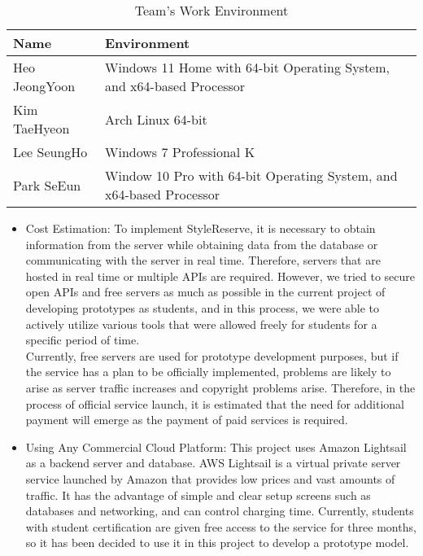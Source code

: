 \documentclass[conference]{IEEEtran}
\begin{document}
 \begin{table}[htdp]
 \caption{Team's Work Environment}
 \begin{tabular}{| p{3cm}|p{5.2cm} |}
 \hline
 Name & Environment \\ 
 \hline
 Heo JeongYoon & Windows 11 Home with 64-bit Operating System, and x64-based Processor \\
 \hline
 Kim TaeHyeon & Arch Linux 64-bit \\ 
 \hline
 Lee SeungHo & Windows 7 Professional K \\ 
 \hline
 Park SeEun & Window 10 Pro with 64-bit Operating System, and x64-based Processor \\ 
 \hline
 \end{tabular}
 \end{table}

\begin{itemize}
    \item Cost Estimation: To implement StyleReserve, it is necessary to obtain information from the server while obtaining data from the database or communicating with the server in real time. Therefore, servers that are hosted in real time or multiple APIs are required. However, we tried to secure open APIs and free servers as much as possible in the current project of developing prototypes as students, and in this process, we were able to actively utilize various tools that were allowed freely for students for a specific period of time.\\
    Currently, free servers are used for prototype development purposes, but if the service has a plan to be officially implemented, problems are likely to arise as server traffic increases and copyright problems arise. Therefore, in the process of official service launch, it is estimated that the need for additional payment will emerge as the payment of paid services is required.\\
    
    \item Using Any Commercial Cloud Platform: This project uses Amazon Lightsail as a backend server and database. AWS Lightsail is a virtual private server service launched by Amazon that provides low prices and vast amounts of traffic. It has the advantage of simple and clear setup screens such as databases and networking, and can control charging time. Currently, students with student certification are given free access to the service for three months, so it has been decided to use it in this project to develop a prototype model.\\
    \end{itemize}
\end{document}

